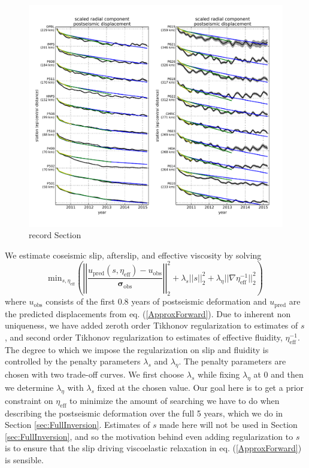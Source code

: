 \documentclass[1p]{elsarticle}
\begin{document}
\begin{figure}
\includegraphics[scale=0.7]{Figures/RecordSectionDuration}
\centering 
\caption{record Section}
\label{fig:RecordSection1}
\end{figure}

We estimate coseismic slip, afterslip, and effective viscosity by solving 
\begin{equation}\label{ObjectiveFunction}
 \mathrm{min}_{s,\eta_\mathrm{eff}} \left(\left|\left|
 \frac{u_\mathrm{pred}(s,\eta_\mathrm{eff}) - u_\mathrm{obs}}
 {\mathbf{\sigma_\mathrm{obs}}}\right|\right|_2^2 + 
 \lambda_s||s||_2^2 + 
 \lambda_\eta||\nabla \eta_{\mathrm{eff}}^{-1}||_2^2\right)
\end{equation} 
where $u_\mathrm{obs}$ consists of the first 0.8 years of postseismic deformation and $u_\mathrm{pred}$ are the predicted displacements from eq. (\ref{ApproxForward}).  Due to inherent non uniqueness, we have added zeroth order Tikhonov regularization to estimates of $s$, and second order Tikhonov regularization to estimates of effective fluidity, $\eta_\mathrm{eff}^{-1}$. The degree to which we impose the regularization on slip and fluidity is controlled by the penalty parameters $\lambda_s$ and $\lambda_\eta$.  The penalty parameters are chosen with two trade-off curves. We first choose $\lambda_s$ while fixing $\lambda_\eta$ at 0 and then we determine $\lambda_\eta$ with $\lambda_s$ fixed at the chosen value. Our goal here is to get a prior constraint on $\eta_{\mathrm{eff}}$ to minimize the amount of searching we have to do when describing the postseismic deformation over the full 5 years, which we do in Section \ref{sec:FullInversion}.  Estimates of $s$ made here will not be used in Section \ref{sec:FullInversion}, and so the motivation behind even adding regularization to $s$ is to ensure that the slip driving viscoelastic relaxation in eq. (\ref{ApproxForward}) is sensible.  
\end{document}
